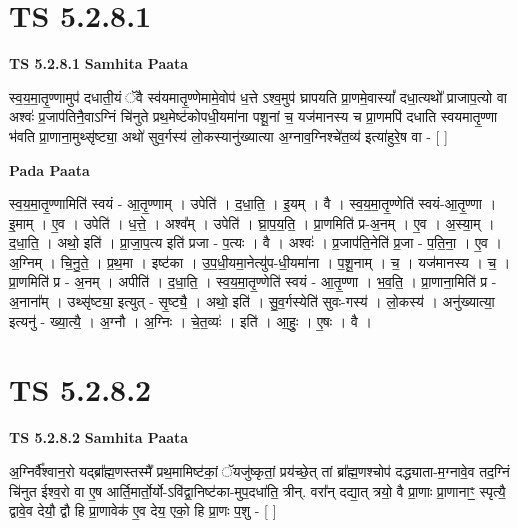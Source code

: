 \documentclass[17pt]{extarticle}
\begin{document}
\section*{ TS 5.2.8.1 }

\textbf{TS 5.2.8.1 } \newline
\textbf{Samhita Paata} \newline

स्व॒य॒मा॒तृ॒ण्णामुप॑ दधाती॒यं ॅवै स्व॑यमातृ॒ण्णेमामे॒वोप॑ ध॒त्ते ऽश्व॒मुप॑ घ्रापयति प्रा॒णमे॒वास्यां᳚ दधा॒त्यथो᳚ प्राजाप॒त्यो वा अश्वः॑ प्र॒जाप॑तिनै॒वाऽग्निं चि॑नुते प्रथ॒मेष्ट॑कोपधी॒यमा॑ना पशू॒नां च॒ यज॑मानस्य च प्रा॒णमपि॑ दधाति स्वयमातृ॒ण्णा भ॑वति प्रा॒णाना॒मुथ्सृ॑ष्ट्या॒ अथो॑ सुव॒र्गस्य॑ लो॒कस्यानु॑ख्यात्या अ॒ग्नाव॒ग्निश्चे॑त॒व्य॑ इत्या॑हुरे॒ष वा - [  ] \newline

\textbf{Pada Paata} \newline

स्व॒य॒मा॒तृ॒ण्णामिति॑ स्वयं - आ॒तृ॒ण्णाम् । उपेति॑ । द॒धा॒ति॒ । इ॒यम् । वै । स्व॒य॒मा॒तृ॒ण्णेति॑ स्वयं-आ॒तृ॒ण्णा । इ॒माम् । ए॒व । उपेति॑ । ध॒त्ते॒ । अश्व᳚म् । उपेति॑ । घ्रा॒प॒य॒ति॒ । प्रा॒णमिति॑ प्र-अ॒नम् । ए॒व । अ॒स्या॒म् । द॒धा॒ति॒ । अथो॒ इति॑ । प्रा॒जा॒प॒त्य इति॑ प्रजा - प॒त्यः । वै । अश्वः॑ । प्र॒जाप॑ति॒नेति॑ प्र॒जा - प॒ति॒ना॒ । ए॒व । अ॒ग्निम् । चि॒नु॒ते॒ । प्र॒थ॒मा । इष्ट॑का । उ॒प॒धी॒यमा॒नेत्यु॑प-धी॒यमा॑ना । प॒शू॒नाम् । च॒ । यज॑मानस्य । च॒ । प्रा॒णमिति॑ प्र - अ॒नम् । अपीति॑ । द॒धा॒ति॒ । स्व॒य॒मा॒तृ॒ण्णेति॑ स्वयं - आ॒तृ॒ण्णा । भ॒व॒ति॒ । प्रा॒णाना॒मिति॑ प्र - अ॒नाना᳚म् । उथ्सृ॑ष्ट्या॒ इत्युत् - सृ॒ष्ट्यै॒ । अथो॒ इति॑ । सु॒व॒र्गस्येति॑ सुवः-गस्य॑ । लो॒कस्य॑ । अनु॑ख्यात्या॒ इत्यनु॑ - ख्या॒त्यै॒ । अ॒ग्नौ । अ॒ग्निः । चे॒त॒व्यः॑ । इति॑ । आ॒हुः॒ । ए॒षः । वै ।  \newline




\section*{ TS 5.2.8.2 }

\textbf{TS 5.2.8.2 } \newline
\textbf{Samhita Paata} \newline

अ॒ग्निर्वै᳚श्वान॒रो यद्ब्रा᳚ह्म॒णस्तस्मै᳚ प्रथ॒मामिष्ट॑कां॒ ॅयजु॑ष्कृतां॒ प्रय॑च्छे॒त् तां ब्रा᳚ह्म॒णश्चोप॑ दद्ध्याता-म॒ग्नावे॒व तद॒ग्निं चि॑नुत ईश्व॒रो वा ए॒ष आर्ति॒मार्तो॒र्यो-ऽवि॑द्वा॒निष्ट॑का-मुप॒दधा॑ति॒ त्रीन्. वरा᳚न् दद्या॒त् त्रयो॒ वै प्रा॒णाः प्रा॒णानाꣳ॒॒ स्पृत्यै॒ द्वावे॒व देयौ॒ द्वौ हि प्रा॒णावेक॑ ए॒व देय॒ एको॒ हि प्रा॒णः प॒शु - [  ] \newline
\end{document}
